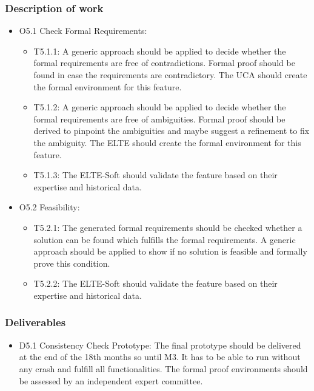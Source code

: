 \subsubsection{Description of work}
\begin{itemize}
	\item O5.1 Check Formal Requirements:
	\begin{itemize}
		\item T5.1.1: A generic approach should be applied to decide whether the formal requirements are free of contradictions. Formal proof should be found in case the requirements are contradictory. The \gls{UCA} should create the formal environment for this feature.
		\item T5.1.2: A generic approach should be applied to decide whether the formal requirements are free of ambiguities. Formal proof should be derived to pinpoint the ambiguities and maybe suggest a refinement to fix the ambiguity. The \gls{ELTE} should create the formal environment for this feature.
		\item T5.1.3: The ELTE-Soft should validate the feature based on their expertise and historical data. 
	\end{itemize}
	\item O5.2 Feasibility:
	\begin{itemize}
		\item T5.2.1: The generated formal requirements should be checked whether a solution can be found which fulfills the formal requirements. A generic approach should be applied to show if no solution is feasible and formally prove this condition.
		\item T5.2.2: The ELTE-Soft should validate the feature based on their expertise and historical data. 
	\end{itemize}
\end{itemize}

\subsubsection{Deliverables}
\begin{itemize}
	\item D5.1 Consistency Check Prototype:  The final prototype should be delivered at the end of the 18th months so until M3. It has to be able to run without any crash and fulfill all functionalities. The formal proof environments should be assessed by an independent expert committee. 
\end{itemize}